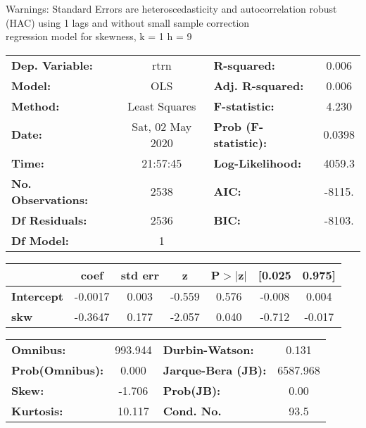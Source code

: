 Warnings: \newline
 [1] Standard Errors are heteroscedasticity and autocorrelation robust (HAC) using 1 lags and without small sample correction\\ 

regression model for skewness, k = 1 h = 9\begin{center}
\begin{tabular}{lclc}
\toprule
\textbf{Dep. Variable:}    &       rtrn       & \textbf{  R-squared:         } &     0.006   \\
\textbf{Model:}            &       OLS        & \textbf{  Adj. R-squared:    } &     0.006   \\
\textbf{Method:}           &  Least Squares   & \textbf{  F-statistic:       } &     4.230   \\
\textbf{Date:}             & Sat, 02 May 2020 & \textbf{  Prob (F-statistic):} &   0.0398    \\
\textbf{Time:}             &     21:57:45     & \textbf{  Log-Likelihood:    } &    4059.3   \\
\textbf{No. Observations:} &        2538      & \textbf{  AIC:               } &    -8115.   \\
\textbf{Df Residuals:}     &        2536      & \textbf{  BIC:               } &    -8103.   \\
\textbf{Df Model:}         &           1      & \textbf{                     } &             \\
\bottomrule
\end{tabular}
\begin{tabular}{lcccccc}
                   & \textbf{coef} & \textbf{std err} & \textbf{z} & \textbf{P$> |$z$|$} & \textbf{[0.025} & \textbf{0.975]}  \\
\midrule
\textbf{Intercept} &      -0.0017  &        0.003     &    -0.559  &         0.576        &       -0.008    &        0.004     \\
\textbf{skw}       &      -0.3647  &        0.177     &    -2.057  &         0.040        &       -0.712    &       -0.017     \\
\bottomrule
\end{tabular}
\begin{tabular}{lclc}
\textbf{Omnibus:}       & 993.944 & \textbf{  Durbin-Watson:     } &    0.131  \\
\textbf{Prob(Omnibus):} &   0.000 & \textbf{  Jarque-Bera (JB):  } & 6587.968  \\
\textbf{Skew:}          &  -1.706 & \textbf{  Prob(JB):          } &     0.00  \\
\textbf{Kurtosis:}      &  10.117 & \textbf{  Cond. No.          } &     93.5  \\
\bottomrule
\end{tabular}
\end{center}

